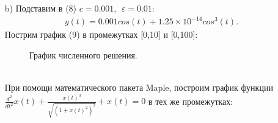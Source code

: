 \documentclass[12pt]{article}
\begin{document}
\begin{itemize}
    \item[b)]
        Подставим в (8) $c=0.001,\:\:\varepsilon=0.01$:
        \begin{eqnarray}
            y(t)=0.001cos(t)+1.25\times 10^{-14}cos^3(t).
        \end{eqnarray}
        Пострим график (9) в промежутках [0,10] и [0,100]:
        \begin{figure}[!h]
            \begin{minipage}[h]{0.5\linewidth}
            \end{minipage}
            \hfill
            \begin{minipage}[h]{0.5\linewidth}
            \end{minipage}
            \caption{График численного решения.}
        \end{figure}
        \\При помощи математического пакета  Maple, построим график функции $\frac{d^2}{dt^2}x(t) + \frac{x(t)^3}{\sqrt{(1 + x(t)^2)^3}} + x(t) = 0$
        в тех же промежутках:
        \begin{figure}[!h]
            \begin{minipage}[h]{0.5\linewidth}

\end{minipage}
\end{figure}
\end{itemize}
\end{document}
